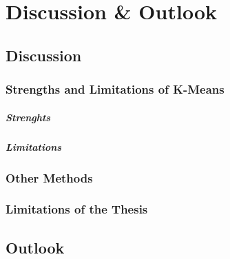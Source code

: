 \chapter{Discussion \& Outlook}
\label{cha:discussion}




\section{Discussion}
\subsection{Strengths and Limitations of K-Means}
\paragraph*{Strenghts}
\paragraph*{Limitations}
\subsection{Other Methods}
\subsection{Limitations of the Thesis}


\section{Outlook}